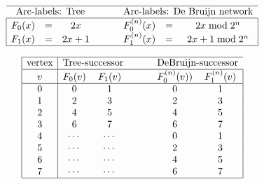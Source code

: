\[
\begin{array}{|ccccccc|}
\hline
\multicolumn{3}{c}{\mbox{Arc-labels: Tree}} & \hspace*{.2in}& \multicolumn{3}{c}{\mbox{Arc-labels: De Bruijn network}} \\
\hline 
F_0(x) & = & 2x      &  &  F^{(n)}_0(x) & = & 2x \bmod 2^n \\
F_1(x) & = & 2x+1  &  &  F^{(n)}_1(x) & = & 2x +1 \bmod 2^n \\ 
\hline
\end{array}
\]

\[
\begin{array}{|c|ccccc|}
\hline
\mbox{vertex} & \multicolumn{2}{c}{\mbox{Tree-successor}} & \hspace*{.2in} & \multicolumn{2}{c}{\mbox{DeBruijn-successor}} \\
\hline
v & F_0(v) & F_1(v) & & F^{(n)}_0(v))& F^{(n)}_1(v) \\
\hline
0 & 0 & 1 & & 0 & 1 \\ 
1 & 2 & 3 & & 2 & 3 \\
2 & 4 & 5 & & 4 & 5 \\
3 & 6 & 7 & & 6 & 7 \\
4 & \cdots & \cdots  & & 0 & 1 \\
5 & \cdots & \cdots  & & 2 & 3 \\
6 & \cdots & \cdots  & & 4 & 5 \\
7 & \cdots & \cdots  & & 6 & 7 \\
\hline
\end{array}
\]
